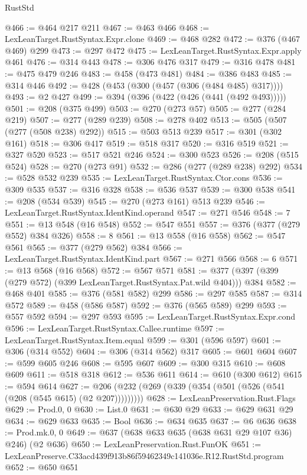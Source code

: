 \begin{lexlean}{RustStd}
\begin{coremodule}
@466 := @464 @217 @211
@467 := @463 @466
@468 := LexLeanTarget.RustSyntax.Expr.clone
@469 := @468 @282
@472 := @376 (@467 @469) @299
@473 := @297 @472
@475 := LexLeanTarget.RustSyntax.Expr.apply @461
@476 := @314 @443
@478 := @306 @476 @317
@479 := @316 @478
@481 := @475 @479 @246
@483 := @458 (@473 @481)
@484 := @386 @483
@485 := @314 @446
@492 := @428 (@453 (@300 (@457 (@306 (@484 @485) @317))))
@493 := @2 @427
@499 := @394 (@396 (@422 (@426 (@441 (@492 @493)))))
@501 := @208 (@375 @499)
@503 := @270 (@273 @57)
@505 := @277 (@284 @219)
@507 := @277 (@289 @239)
@508 := @278 @402
@513 := @505 (@507 (@277 (@508 @238) @292))
@515 := @503 @513 @239
@517 := @301 (@302 @161)
@518 := @306 @417
@519 := @518 @317
@520 := @316 @519
@521 := @327 @520
@523 := @517 @521 @246
@524 := @300 @523
@526 := @208 (@515 @524)
@528 := @270 (@273 @91)
@532 := @286 (@277 (@289 @238) @292)
@534 := @528 @532 @239
@535 := LexLeanTarget.RustSyntax.Ctor.cons
@536 := @309 @535
@537 := @316 @328
@538 := @536 @537
@539 := @300 @538
@541 := @208 (@534 @539)
@545 := @270 (@273 @161) @513 @239
@546 := LexLeanTarget.RustSyntax.IdentKind.operand
@547 := @271 @546
@548 := 7
@551 := @13 @548 (@16 @548)
@552 := @547 @551
@557 := @376 (@377 (@279 @552) @384 @326)
@558 := 8
@561 := @13 @558 (@16 @558)
@562 := @547 @561
@565 := @377 (@279 @562) @384
@566 := LexLeanTarget.RustSyntax.IdentKind.part
@567 := @271 @566
@568 := 6
@571 := @13 @568 (@16 @568)
@572 := @567 @571
@581 := @377 (@397 (@399 (@279 @572) (@399 LexLeanTarget.RustSyntax.Pat.wild @404))) @384
@582 := @468 @401
@585 := @376 (@581 @582) @299
@586 := @297 @585
@587 := @314 @572
@589 := @458 (@586 @587)
@592 := @376 (@565 @589) @299
@593 := @557 @592
@594 := @297 @593
@595 := LexLeanTarget.RustSyntax.Expr.cond
@596 := LexLeanTarget.RustSyntax.Callee.runtime
@597 := LexLeanTarget.RustSyntax.Item.equal
@599 := @301 (@596 @597)
@601 := @306 (@314 @552)
@604 := @306 (@314 @562) @317
@605 := @601 @604
@607 := @599 @605 @246
@608 := @595 @607
@609 := @300 @315
@610 := @608 @609
@611 := @518 @318
@612 := @536 @611
@614 := @610 (@300 @612)
@615 := @594 @614
@627 := @206 (@232 (@269 (@339 (@354 (@501 (@526 (@541 (@208 (@545 @615) (@2 @207)))))))))
@628 := LexLeanPreservation.Rust.Flags
@629 := Prod.{0, 0}
@630 := List.{0}
@631 := @630 @29
@633 := @629 @631 @29
@634 := @629 @633
@635 := Bool
@636 := @634 @635
@637 := @6 @636
@638 := Prod.mk.{0, 0}
@649 := @637 (@638 @633 @635 (@638 @631 @29 @107 @36) @246) (@2 @636)
@650 := LexLeanPreservation.Rust.FunOK
@651 := LexLeanPreserve.C33acd439f913b86f59462349c141036e.R12.RustStd.program
@652 := @650 @651

\end{coremodule}
\end{lexlean}
